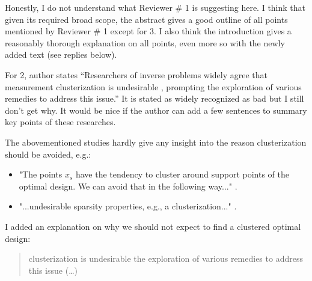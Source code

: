 \documentclass{ar2rc}
\begin{document}
\AR Honestly, I do not understand what Reviewer \# 1 is suggesting
here. I think that given its required broad scope, the abstract gives
a good outline of all points mentioned by Reviewer \# 1 except for
3. I also think the introduction gives a reasonably thorough
explanation on all points, even more so with the newly added text (see
replies below).

\RC For 2, author states “Researchers of inverse problems widely agree
that measurement clusterization is undesirable \cite{fedorov1996,
  nyberg2012, fedorov1997, Ucinski05, neitzel2019sparse}, prompting
the exploration of various remedies to address this issue.” It is
stated as widely recognized as bad but I still don’t get why. It would
be nice if the author can add a few sentences to summary key points of
these researches.

\AR The abovementioned studies hardly give any insight into the reason
clusterization should be avoided, e.g.:
\begin{itemize}
  \item "The points $x_s$ have the tendency to cluster around support
    points of the optimal design. We can avoid that in the following
    way..." \cite{fedorov1997}.
\item "...undesirable sparsity properties, e.g., a clusterization..."
  \cite{neitzel2019sparse}.
\end{itemize}
I added an explanation on why we should not expect to find a clustered
optimal design:

\begin{quote}
\DIFdelbegin {}\DIFdelend \DIFaddbegin {}

\emph{} 

\DIFaddend clusterization is undesirable \DIFdelbegin {}\DIFdelend \DIFaddbegin {}\DIFaddend the exploration
of various remedies to address this issue (\dots)
\end{quote}
\end{document}
